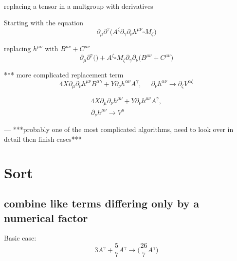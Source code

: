 \documentclass{article}
\def\){\Big)}
\def\({\Big(}
\begin{document}
{\begin{itemize}
{\color{red}
\item{replacing a tensor in a multgroup with derivatives}

Starting with the equation
\begin{equation}
\partial_{\mu} \partial^{\gamma}\(A^{\zeta} \partial_{\gamma} \partial_{\nu} h^{\mu \nu} \square M_{\zeta}\)
\end{equation}

replacing $ h^{\mu \nu} $ with $ B^{\mu \nu} + C^{\mu \nu} $
\begin{equation}
\partial_{\mu} \partial^{\gamma} \(\)+ A^{\zeta} \square M_{\zeta} \partial_{\gamma} \partial_{\nu} \( B^{\mu \nu} + C^{\mu \nu} \)
\end{equation}
}

\end{itemize}

{\color{red}
*** more complicated replacement term
\begin{equation}
4X \partial_{\mu} \partial_{\nu}h^{\mu \nu} B^{\alpha \gamma} +Y \partial_{\nu}h^{\alpha \nu} A^{\gamma} , \; \; \; \; \;
 \partial_{\nu}h^{\alpha \nu} \rightarrow \partial_{\zeta} V^{\alpha \zeta} 
  \end{equation}
}

{\color{red}
\begin{multline}
4X \partial_{\mu} \partial_{\nu}h^{\mu \nu} +Y \partial_{\nu}h^{\mu \nu} A^{\gamma} , \\
 \partial_{\nu}h^{\mu \nu} \rightarrow  V^{\mu} 
\end{multline}
}


— ***probably one of the most complicated algorithms, need to look over in detail then finish cases***\\





\section{Sort}


\subsection{ combine like terms differing only by a numerical factor}

Basic case:
\begin{equation}
3A^{\gamma} + \frac{5}{7} A^{\gamma} \rightarrow 
\(\frac{26}{7} A^{\gamma} \)
\end{equation}

}
\end{document}
